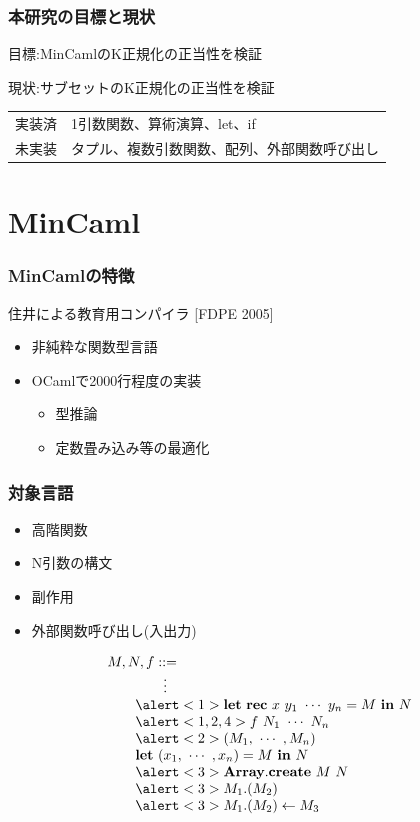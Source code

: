 \documentclass[dvipdfmx,cjk,xcolor=dvipsnames,envcountsect,notheorems,12pt]{beamer}
\theoremstyle{definition}
\newcommand{\keyword}[1]{\mathbf{#1}}
\newcommand{\LET}{\keyword{let}}
\newcommand{\REC}{\keyword{rec}}
\newcommand{\ARRAY}{\keyword{Array}}
\newcommand{\CREATE}{\keyword{create}}
\newcommand{\IN}{\keyword{in}}
\begin{document}
\begin{frame}
	\frametitle{本研究の目標と現状}
	\Large 目標:MinCamlのK正規化の正当性を検証

	\vfill

	現状:サブセットのK正規化の正当性を検証
	\begin{center}
		\normalsize
		\begin{tabular}{ll}
			実装済 & 1引数関数、算術演算、let、if \\
			未実装 & タプル、複数引数関数、配列、外部関数呼び出し \\
		\end{tabular}
	\end{center}
\end{frame}

\section{MinCaml}

\begin{frame}
	\frametitle{MinCamlの特徴}
	\Large 住井による教育用コンパイラ [FDPE 2005]
	\begin{itemize}
		\item 非純粋な関数型言語
		\item OCamlで2000行程度の実装
			\begin{itemize}
				\item 型推論
				\item 定数畳み込み等の最適化
			\end{itemize}
	\end{itemize}
\end{frame}

\begin{frame}
	\frametitle{対象言語}
	\Large
	\begin{itemize}
		\item \alert<1>{高階関数}
		\item \alert<2>{N引数の構文}
		\item \alert<3>{副作用}
		\item \alert<4>{外部関数呼び出し(入出力)}
	\end{itemize}
	{\normalsize
	\[
	\begin{array}{l}
		M, N, f ::= \\
		\qquad \qquad \vdots\\
		\qquad \alert<1>{\LET~\REC~x~y_1~\cdots~y_n=M~\IN~N}\\
		\qquad \alert<1,2,4>{f~N_1~\cdots~N_n}\\
		\qquad \alert<2>{(M_1,~\cdots~,M_n)}\\
		\qquad \LET~(x_1,~\cdots~,x_n)=M~\IN~N\\
		\qquad \alert<3>{\ARRAY.\CREATE~M~N}\\
		\qquad \alert<3>{M_1.(M_2)}\\
		\qquad \alert<3>{M_1.(M_2)\leftarrow M_3}\\
	\end{array}
	\]}
	\pause
	\pause
	\pause
\end{frame}
\end{document}
